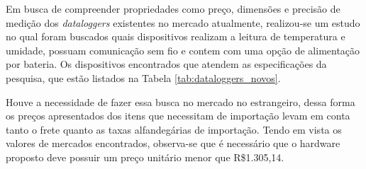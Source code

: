 Em busca de compreender propriedades como preço, dimensões e precisão de medição dos \textit{dataloggers} existentes no mercado atualmente, realizou-se um estudo no qual foram buscados quais dispositivos realizam a leitura de temperatura e umidade, possuam comunicação sem fio e contem com uma opção de alimentação por bateria. Os dispositivos encontrados que atendem as especificações da pesquisa, que estão listados na Tabela \ref{tab:dataloggers_novos}. 
	\begin{table}[!h]
	
	\captionsetup{width=8cm}%
    \end{table}

Houve a necessidade de fazer essa busca no mercado no estrangeiro, dessa forma os preços apresentados dos itens que necessitam de importação levam em conta tanto o frete quanto as taxas alfandegárias de importação. Tendo em vista os valores de mercados encontrados, observa-se que é necessário que o hardware proposto deve possuir um preço unitário menor que R\$1.305,14. 


